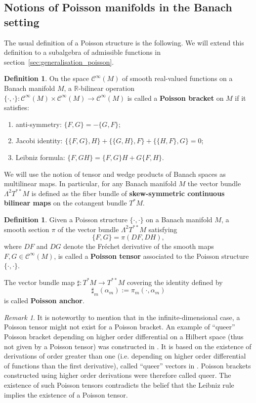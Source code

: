 \documentclass[a4paper,12pt,reqno]{amsart}%
\theoremstyle{definition}
\newtheorem{definition}[theorem]{Definition}
\theoremstyle{remark}
\newtheorem{remark}[theorem]{Remark}
\numberwithin{theorem}{section}
\numberwithin{equation}{section}
\newcommand{\1}{{\bf 1}}
\newcommand{\Cp}{\mathscr{C}}
\begin{document}
\subsection{Notions of Poisson manifolds in the Banach setting}
The usual definition of a Poisson structure is the following. We will extend this definition to a subalgebra of admissible functions in section~\ref{sec:generalisation_poisson}.
\begin{definition}\label{condition_poisson}
On the space $\Cp^{\infty}(M)$ of smooth real-valued functions on a Banach manifold $M$, a $\mathbb{R}$-bilinear operation $\{\cdot,\cdot\}: \Cp^{\infty}(M)\times\Cp^{\infty}(M)\rightarrow\Cp^{\infty}(M)$ is called a \textbf{Poisson bracket} on $M$ if it satisfies:
\begin{enumerate}
\item[(i)] anti-symmetry: $\{F, G\} = -\{G, F\};$
\item[(ii)] Jacobi identity: $\{\{F, G\}, H\} + \{\{G, H\}, F\} + \{\{H, F\}, G\} =  0$;
\item[(iii)] Leibniz formula: $\{F, GH\} = \{F, G\}H + G\{F, H\}$.
\end{enumerate}
\end{definition}


We will use the notion of tensor and wedge products of Banach spaces as multilinear maps. In particular, for any Banach manifold $M$ the vector bundle $\Lambda^2T^{**}M$ is defined as the fiber bundle of \textbf{skew-symmetric continuous bilinear maps} on the cotangent bundle $T^*M$.

\begin{definition}
Given a Poisson structure $\{\cdot, \cdot\}$ on a Banach manifold $M$, a smooth section $\pi$ of the vector bundle $\Lambda^2T^{**}M$  satisfying 
\[\{F, G\} = \pi(DF, DH),\]
where $DF$ and $DG$ denote the Fr\'echet derivative of the smooth maps $F, G\in\Cp^{\infty}(M)$, is called a \textbf{Poisson tensor} associated to the Poisson structure $\{\cdot,\cdot\}$.

The vector bundle map $\sharp:T^*M \longrightarrow T^{**}M$ covering the identity defined by 
\[\sharp_m(\alpha_m) := \pi_m(\cdot, \alpha_m)\]
is called \textbf{Poisson anchor}.
\end{definition}


\begin{remark}
It is noteworthy to mention that in the infinite-dimensional case, a Poisson tensor might not exist for a Poisson bracket. An example of ``queer'' Poisson bracket depending on higher order differential on a Hilbert space (thus not given by a Poisson tensor) was constructed in \cite{BGT}. It is based on the existence of derivations of order greater than one (i.e. depending on higher order differential of functions than the first derivative), called ``queer'' vectors in \cite{michor}. Poisson brackets constructed using higher order derivations were therefore called queer. The existence of such Poisson tensors contradicts the belief that the Leibniz rule implies the existence of a Poisson tensor. 
\end{remark}
\end{document}
